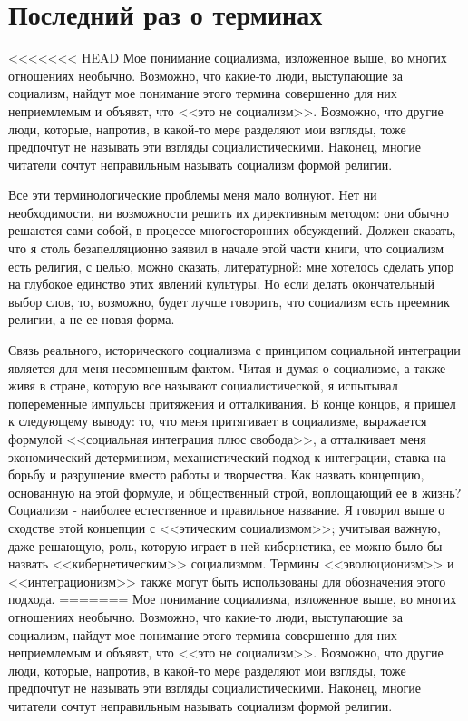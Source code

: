 \documentclass{book}
\begin{document}
\section{Последний раз о терминах}

<<<<<<< HEAD
Мое понимание социализма, изложенное выше, во многих отношениях необычно. Возможно, что какие‑то люди, выступаю­щие за социализм, найдут мое понимание этого термина совер­шенно для них неприемлемым и объявят, что <<это не социализм>>. Возможно, что другие люди, которые, напротив, в какой‑то ме­ре разделяют мои взгляды, тоже предпочтут не называть эти взгляды социалистическими. Наконец, многие читатели сочтут неправильным называть социализм формой религии.

Все эти терминологические проблемы меня мало волнуют. Нет ни необходимости, ни возможности решить их директивным методом: они обычно решаются сами собой, в процессе много­сторонних обсуждений. Должен сказать, что я столь безапелля­ционно заявил в начале этой части книги, что социализм есть религия, с целью, можно сказать, литературной: мне хотелось сделать упор на глубокое единство этих явлений культуры. Но если делать окончательный выбор слов, то, возможно, будет лучше говорить, что социализм есть преемник религии, а не ее новая форма.

Связь реального, исторического социализма с принципом социальной интеграции является для меня несомненным фактом. Читая и думая о социализме, а также живя в стране, которую все называют социалистической, я испытывал попеременные импульсы притяжения и отталкивания. В конце концов, я при­шел к следующему выводу: то, что меня притягивает в социализ­ме, выражается формулой <<социальная интеграция плюс свобо­да>>, а отталкивает меня экономический детерминизм, механи­стический подход к интеграции, ставка на борьбу и разрушение вместо работы и творчества. Как назвать концепцию, основан­ную на этой формуле, и общественный строй, воплощающий ее в жизнь? Социализм ‑ наиболее естественное и правильное на­звание. Я говорил выше о сходстве этой концепции с <<этическим социализмом>>; учитывая важную, даже решающую, роль, которую играет в ней кибернетика, ее можно было бы назвать <<кибер­нетическим>> социализмом. Термины <<эволюционизм>> и <<интеграционизм>> также могут быть использованы для обозначения этого подхода.
=======
Мое понимание социализма, изложенное выше, во многих отношениях необычно. Возможно, что какие-то люди, выступаю­щие за социализм, найдут мое понимание этого термина совер­шенно для них неприемлемым и объявят, что <<это не социализм>>. Возможно, что другие люди, которые, напротив, в какой-то ме­ре разделяют мои взгляды, тоже предпочтут не называть эти взгляды социалистическими. Наконец, многие читатели сочтут неправильным называть социализм формой религии.
\end{document}
